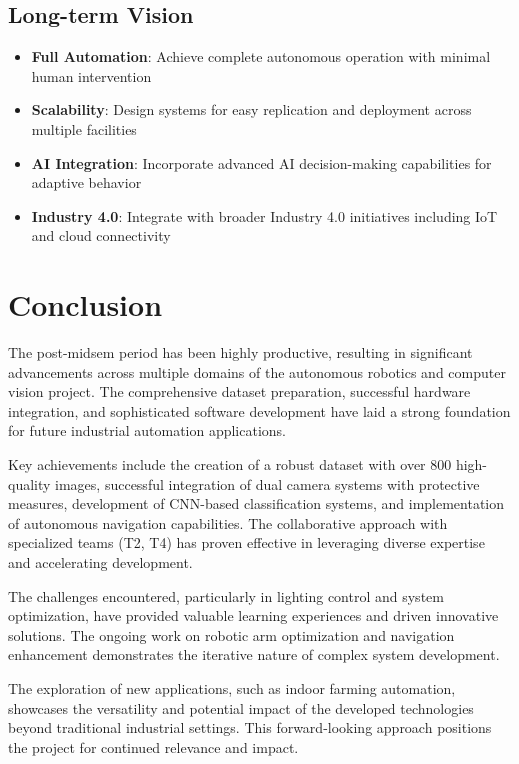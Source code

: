 \documentclass[12pt]{article}
\begin{document}
\subsection{Long-term Vision}
\begin{itemize}
\item \textbf{Full Automation}: Achieve complete autonomous operation with minimal human intervention
\item \textbf{Scalability}: Design systems for easy replication and deployment across multiple facilities
\item \textbf{AI Integration}: Incorporate advanced AI decision-making capabilities for adaptive behavior
\item \textbf{Industry 4.0}: Integrate with broader Industry 4.0 initiatives including IoT and cloud connectivity
\end{itemize}

\newpage

\section{Conclusion}

The post-midsem period has been highly productive, resulting in significant advancements across multiple domains of the autonomous robotics and computer vision project. The comprehensive dataset preparation, successful hardware integration, and sophisticated software development have laid a strong foundation for future industrial automation applications.

Key achievements include the creation of a robust dataset with over 800 high-quality images, successful integration of dual camera systems with protective measures, development of CNN-based classification systems, and implementation of autonomous navigation capabilities. The collaborative approach with specialized teams (T2, T4) has proven effective in leveraging diverse expertise and accelerating development.

The challenges encountered, particularly in lighting control and system optimization, have provided valuable learning experiences and driven innovative solutions. The ongoing work on robotic arm optimization and navigation enhancement demonstrates the iterative nature of complex system development.

The exploration of new applications, such as indoor farming automation, showcases the versatility and potential impact of the developed technologies beyond traditional industrial settings. This forward-looking approach positions the project for continued relevance and impact.
\end{document}
